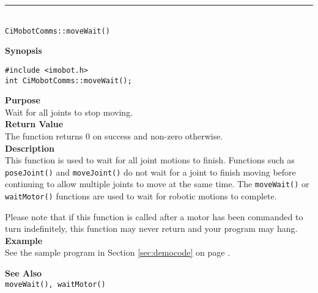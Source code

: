 \noindent
\vspace{5pt}
\rule{4.5in}{0.015in}\\
\noindent
{\LARGE \texttt{CiMobotComms::moveWait()}}\\
{}

\noindent
{\bf Synopsis}\\
\begin{verbatim}
#include <imobot.h>
int CiMobotComms::moveWait();
\end{verbatim}

\noindent
{\bf Purpose}\\
Wait for all joints to stop moving.\\

\noindent
{\bf Return Value}\\
The function returns 0 on success and non-zero otherwise.\\

\noindent
{\bf Description}\\
This function is used to wait for all joint motions to finish. Functions such as
\texttt{poseJoint()} and \texttt{moveJoint()} do not wait for a joint to finish
moving before continuing to allow multiple joints to move at the same time. The
\texttt{moveWait()} or \texttt{waitMotor()} functions are used to wait for
robotic motions to complete.

Please note that if this function is called after a motor has been commanded to
turn indefinitely, this function may never return and your program may hang.\\

\noindent
{\bf Example}\\
See the sample program in Section \ref{sec:democode} on page \pageref{sec:democode}.
\noindent

\noindent
{\bf See Also}\\
\texttt{moveWait(), waitMotor()}

